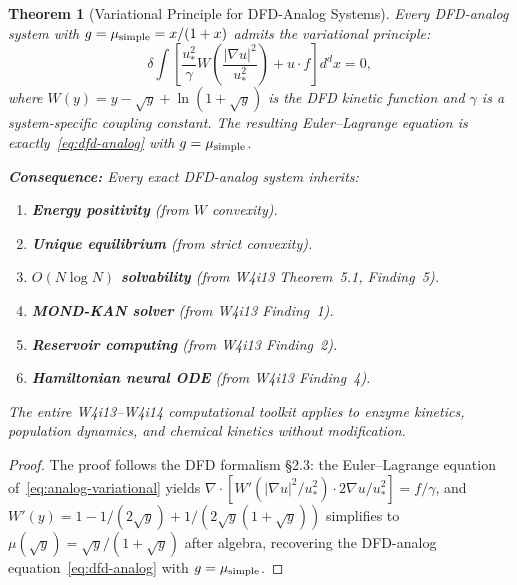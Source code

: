 \documentclass[11pt]{article}
\newtheorem{theorem}{Theorem}[section]
\theoremstyle{definition}
\theoremstyle{remark}
\begin{document}
\begin{theorem}[Variational Principle for DFD-Analog Systems]
\label{thm:analog-variational}
Every DFD-analog system with $g = \mu_{\rm simple} = x/(1+x)$ admits
the variational principle:
\begin{equation}
  \delta \int \left[\frac{u_*^2}{\gamma} W\!\left(\frac{|\nabla u|^2}{u_*^2}\right)
  + u \cdot f\right] d^dx = 0,
  \label{eq:analog-variational}
\end{equation}
where $W(y) = y - \sqrt{y} + \ln(1+\sqrt{y})$ is the DFD kinetic function
and $\gamma$ is a system-specific coupling constant. The resulting
Euler--Lagrange equation is exactly~\eqref{eq:dfd-analog} with
$g = \mu_{\rm simple}$.

\textbf{Consequence:} Every exact DFD-analog system inherits:
\begin{enumerate}
\item \textbf{Energy positivity} (from $W$ convexity).
\item \textbf{Unique equilibrium} (from strict convexity).
\item \textbf{$O(N \log N)$ solvability} (from W4i13 Theorem~5.1, Finding~5).
\item \textbf{MOND-KAN solver} (from W4i13 Finding~1).
\item \textbf{Reservoir computing} (from W4i13 Finding~2).
\item \textbf{Hamiltonian neural ODE} (from W4i13 Finding~4).
\end{enumerate}
The entire W4i13--W4i14 computational toolkit applies to enzyme kinetics,
population dynamics, and chemical kinetics \emph{without modification}.
\end{theorem}

\begin{proof}
The proof follows the DFD formalism \S2.3: the Euler--Lagrange equation
of~\eqref{eq:analog-variational} yields
$\nabla\cdot[W'(|\nabla u|^2/u_*^2) \cdot 2\nabla u/u_*^2] = f/\gamma$,
and $W'(y) = 1 - 1/(2\sqrt{y}) + 1/(2\sqrt{y}(1+\sqrt{y}))$ simplifies
to $\mu(\sqrt{y}) = \sqrt{y}/(1+\sqrt{y})$ after algebra, recovering
the DFD-analog equation~\eqref{eq:dfd-analog} with $g = \mu_{\rm simple}$.
\end{proof}
\end{document}
